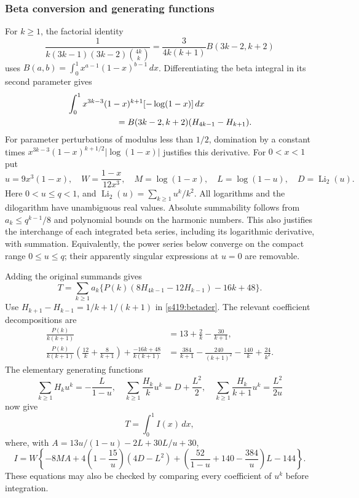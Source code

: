 \documentclass[11pt,a4paper]{article}
\theoremstyle{remark}\newtheorem{remark}[theorem]{Remark}
\newcommand{\Li}{\operatorname{Li}_2}
\numberwithin{equation}{section}
\begin{document}
\subsubsection{Beta conversion and generating functions}
For $k\ge1$, the factorial identity
\begin{equation}\label{s419:beta}
 \frac1{k(3k-1)(3k-2)\binom{4k}{k}}
 =\frac3{4k(k+1)}B(3k-2,k+2)
\end{equation}
uses $B(a,b)=\int_0^1x^{a-1}(1-x)^{b-1}\,dx$.
Differentiating the beta integral in its second parameter gives
\begin{align}
 &\int_0^1x^{3k-3}(1-x)^{k+1}[-\log(1-x)]\,dx\notag\\
 &\hspace{20mm}=B(3k-2,k+2)(H_{4k-1}-H_{k+1}).\label{s419:betader}
\end{align}
For parameter perturbations of modulus less than $1/2$, domination by a
constant times $x^{3k-3}(1-x)^{k+1/2}|\log(1-x)|$ justifies this derivative.
For $0<x<1$ put
\begin{equation}\label{s419:vars}
 u=9x^3(1-x),\quad W=\frac{1-x}{12x^3},\quad
 M=\log(1-x),\quad L=\log(1-u),\quad D=\Li(u).
\end{equation}
Here $0<u\le q<1$, and $\Li(u)=\sum_{k\ge1}u^k/k^2$. All logarithms and
the dilogarithm have unambiguous real values. Absolute summability follows
from $a_k\le q^{k-1}/8$ and polynomial bounds on the harmonic numbers.
This also justifies the interchange of each integrated beta series,
including its logarithmic derivative, with summation. Equivalently, the
power series below converge on the compact range $0\le u\le q$; their
apparently singular expressions at $u=0$ are removable.

Adding the original summands gives
\[
 T=\sum_{k\ge1}a_k\{P(k)(8H_{4k-1}-12H_{k-1})-16k+48\}.
\]
Use $H_{k+1}-H_{k-1}=1/k+1/(k+1)$ in \eqref{s419:betader}. The relevant
coefficient decompositions are
\begin{align*}
 \frac{P(k)}{k(k+1)}&=13+\frac2k-\frac{30}{k+1},\\
 \frac{P(k)}{k(k+1)}\left(\frac{12}k+\frac8{k+1}\right)
 +\frac{-16k+48}{k(k+1)}
 &=\frac{384}{k+1}-\frac{240}{(k+1)^2}-\frac{140}k+\frac{24}{k^2}.
\end{align*}
The elementary generating functions
\[
 \sum_{k\ge1}H_ku^k=-\frac{L}{1-u},\quad
 \sum_{k\ge1}\frac{H_k}ku^k=D+\frac{L^2}2,\quad
 \sum_{k\ge1}\frac{H_k}{k+1}u^k=\frac{L^2}{2u}
\]
now give
\begin{equation}\label{s419:Tintegral}
 T=\int_0^1 I(x)\,dx,
\end{equation}
where, with $A=13u/(1-u)-2L+30L/u+30$,
\begin{equation}\label{s419:I}
 I=W\left\{-8MA+4\left(1-\frac{15}u\right)(4D-L^2)
       +\left(\frac{52}{1-u}+140-\frac{384}u\right)L-144\right\}.
\end{equation}
These equations may also be checked by comparing every coefficient of
$u^k$ before integration.
\end{document}
